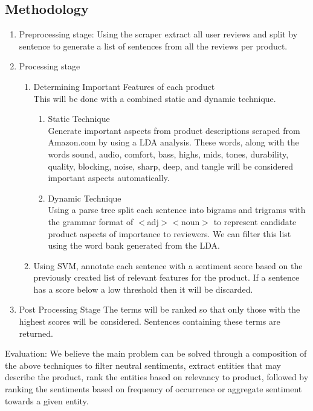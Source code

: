 \documentclass{article}
\begin{document}
\subsection{Methodology}
\begin{enumerate}
\item Preprocessing stage: 
\newline Using the scraper extract all user reviews and split by sentence to generate a list of sentences from all the reviews per product.

\item Processing stage
	\begin{enumerate} [label* = \arabic*.]
	\item Determining Important Features of each product \\
	This will be done with a combined static and dynamic technique.
		\begin{enumerate} [label* = \arabic*.]
	\item Static Technique \\
	 Generate important aspects from product descriptions scraped from Amazon.com by using a LDA analysis. These words, along with the words sound, audio, comfort, bass, highs, mids, tones, durability, quality, blocking, noise, sharp, deep, and tangle will be considered important aspects automatically.
	\item Dynamic Technique \\
	 Using a parse tree split each sentence into bigrams and trigrams with the grammar format of $<$adj$><$noun$>$ to represent candidate product aspects of importance to reviewers. We can filter this list using the word bank generated from the LDA.
	\end{enumerate}
		\item Using SVM, annotate each sentence with a sentiment score based on the previously created list of relevant features for the product. If a sentence has a score below a low threshold then it will be discarded.
	\end{enumerate}
\item Post Processing Stage
The terms will be ranked so that only those with the highest scores will be considered. Sentences containing these terms are returned.
\end{enumerate}
Evaluation: We believe the main problem can be solved through a composition of the above techniques to filter neutral sentiments, extract entities that may describe the product, rank the entities based on relevancy to product, followed by ranking the sentiments based on frequency of occurrence or aggregate sentiment towards a given entity.  
\end{document}
